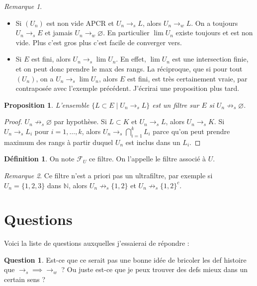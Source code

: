 \documentclass{article}
\newcommand{\N}{\mathbb{N}}
\newcommand{\F}{\mathcal{F}}
\theoremstyle{plain}
\newtheorem{proposition}[theorem]{Proposition}
\theoremstyle{definition}
\newtheorem{definition}[theorem]{Définition}
\newtheorem{question}{Question}
\theoremstyle{remark}
\newtheorem*{remark}{Remarque}
\begin{document}
\begin{remark} \leavevmode
    \begin{itemize}
        \item Si $(U_n)$ est non vide APCR et $U_n \to_s L$, alors $U_n \to_w L$. On a toujours $U_n \to_s E$ et jamais $U_n \to_w \varnothing$. En particulier $\lim U_n$ existe toujours et est non vide. Plus c'est gros plus c'est facile de converger vers.
        \item Si $E$ est fini, alors $U_n \to_s \lim U_n$. En effet, $\lim U_n$ est une intersection finie, et on peut donc prendre le max des rangs. La réciproque, que si pour tout $(U_n)$, on a $U_n \to_s \lim U_n$, alors $E$ est fini, est très certainement vraie, par contraposée avec l'exemple précédent. J'écrirai une proposition plus tard.
    \end{itemize}
\end{remark}

\begin{proposition}
    L'ensemble $\{L \subset E \mid U_n \to_s L\}$ est un filtre sur $E$ si $U_n \not \to_s \varnothing$.
\end{proposition}

\begin{proof}
    $U_n \not \to_s \varnothing$ par hypothèse. Si $L \subset K$ et $U_n \to_s L$, alors $U_n \to_s K$. Si $U_n \to_s L_i$ pour $i = 1,\dots,k$, alors $U_n \to_s \bigcap\limits_{i=1}^k L_i$ parce qu'on peut prendre maximum des rangs à partir duquel $U_n$ est inclus dans un $L_i$.
\end{proof}

\begin{definition}
    On note $\F_U$ ce filtre. On l'appelle le filtre associé à $U$.
\end{definition}

\begin{remark}
    Ce filtre n'est a priori pas un ultrafiltre, par exemple si $U_n = \{1,2,3\}$ dans $\N$, alors $U_n \not \to_s \{1,2\}$ et $U_n \not \to_s \{1,2\}^c$.
\end{remark}

\section{Questions}

Voici la liste de questions auxquelles j'essaierai de répondre :

\begin{question} \label{Qdefs}
    Est-ce que ce serait pas une bonne idée de bricoler les def histoire que $\to_s \implies \to_w$ ? Ou juste est-ce que je peux trouver des defs mieux dans un certain sens ?
\end{question}
\end{document}
